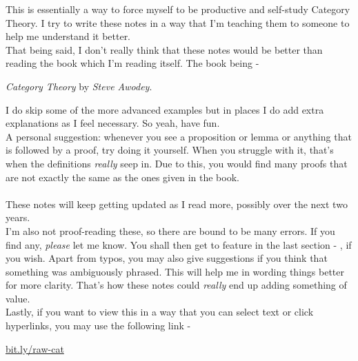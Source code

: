 This is essentially a way to force myself to be productive and self-study Category Theory. I try to write these notes in a way that I'm teaching them to someone to help me understand it better.\\
That being said, I don't really think that these notes would be better than reading the book which I'm reading itself. The book being - 
\begin{center}
	\emph{Category Theory} by \emph{Steve Awodey}.
\end{center}
I do skip some of the more advanced examples but in places I do add extra explanations as I feel necessary. So yeah, have fun.\\
A personal suggestion: whenever you see a proposition or lemma or anything that is followed by a proof, try doing it yourself. When you struggle with it, that's when the definitions \emph{really} seep in. Due to this, you would find many proofs that are not exactly the same as the ones given in the book. \\~\\
These notes will keep getting updated as I read more, possibly over the next two years.\\
I'm also not proof-reading these, so there are bound to be many errors. If you find any, \emph{please} let me know. You shall then get to feature in the last section - , if you wish. Apart from typos, you may also give suggestions if you think that something was ambiguously phrased. This will help me in wording things better for more clarity. That's how these notes could \emph{really} end up adding something of value.\\
Lastly, if you want to view this in a way that you can select text or click hyperlinks, you may use the following link - 
\begin{center}
	\url{bit.ly/raw-cat}
\end{center}